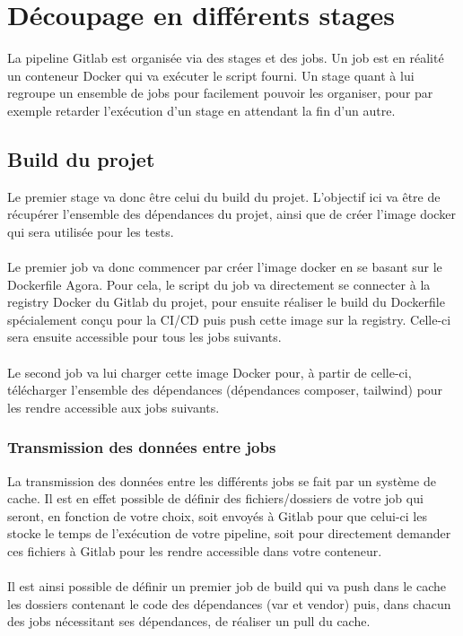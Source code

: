 \documentclass{article}
\begin{document}
    \section{Découpage en différents stages}

        La pipeline Gitlab est organisée via des stages et des jobs. Un job est en réalité un conteneur Docker qui va exécuter le script fourni. Un stage quant à lui regroupe un ensemble de jobs pour facilement pouvoir les organiser, pour par exemple retarder l'exécution d'un stage en attendant la fin d'un autre.

        \subsection{Build du projet}

        Le premier stage va donc être celui du build du projet. L'objectif ici va être de récupérer l'ensemble des dépendances du projet, ainsi que de créer l'image docker qui sera utilisée pour les tests.\\
        \\
        \indent Le premier job va donc commencer par créer l'image docker en se basant sur le Dockerfile Agora. Pour cela, le script du job va directement se connecter à la registry Docker du Gitlab du projet, pour ensuite réaliser le build du Dockerfile spécialement conçu pour la CI/CD puis push cette image sur la registry. Celle-ci sera ensuite accessible pour tous les jobs suivants.\\
        \\
        \indent Le second job va lui charger cette image Docker pour, à partir de celle-ci, télécharger l'ensemble des dépendances (dépendances composer, tailwind) pour les rendre accessible aux jobs suivants.

            \subsubsection{Transmission des données entre jobs}

                La transmission des données entre les différents jobs se fait par un système de cache. Il est en effet possible de définir des fichiers/dossiers de votre job qui seront, en fonction de votre choix, soit envoyés à Gitlab pour que celui-ci les stocke le temps de l'exécution de votre pipeline, soit pour directement demander ces fichiers à Gitlab pour les rendre accessible dans votre conteneur.\\
                \\
                \indent Il est ainsi possible de définir un premier job de build qui va push dans le cache les dossiers contenant le code des dépendances (var et vendor) puis, dans chacun des jobs nécessitant ses dépendances, de réaliser un pull du cache.
\end{document}
